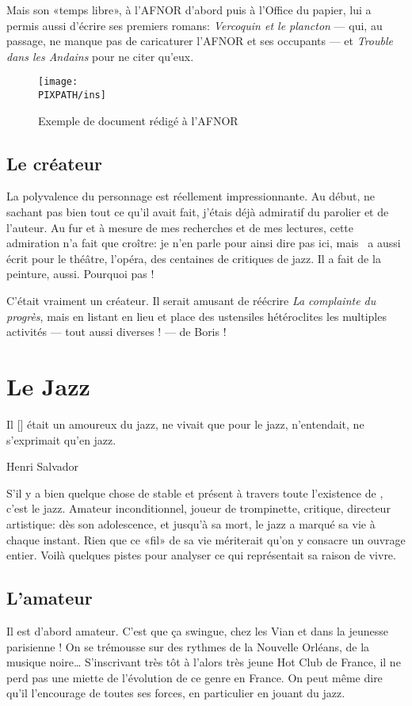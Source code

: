 Mais son «temps libre», à l'AFNOR d'abord puis à l'Office du papier, lui a permis aussi d'écrire ses premiers romans:
\emph{Vercoquin et le plancton} --- qui, au passage, ne manque pas de caricaturer l'AFNOR
et ses occupants --- et \emph{Trouble dans les Andains} pour ne citer qu'eux.

\begin{figure}
\centering
\texttt{[image: \\PIXPATH/ins]}
\caption{Exemple de document rédigé à l'AFNOR}
\label{ins}
\end{figure}

\subsection{Le créateur}

La polyvalence du personnage est réellement impressionnante. Au début, ne sachant pas bien
tout ce qu'il avait fait, j'étais déjà admiratif du parolier et de l'auteur. Au fur et
à mesure de mes recherches et de mes lectures, cette admiration n'a fait que croître: je n'en parle
pour ainsi dire pas ici, mais \BV\ a aussi écrit pour le théâtre, l'opéra, des centaines de
critiques de jazz. Il a fait de la peinture, aussi. Pourquoi pas !

C'était vraiment un créateur. Il serait amusant de réécrire \emph{La complainte du progrès},
mais en listant en lieu et place des ustensiles hétéroclites les multiples activités --- tout
aussi diverses ! --- de Boris !


\section{Le Jazz}
\epigraph{Il [\BV] était un amoureux du jazz, ne vivait que pour le jazz, n'entendait, ne s'exprimait qu'en jazz.}
{Henri Salvador}

S'il y a bien quelque chose de stable et présent à travers toute l'existence de \BV, c'est le jazz.
Amateur inconditionnel, joueur de trompinette, critique, directeur artistique: dès son adolescence, et
jusqu'à sa mort, le jazz a marqué sa vie à chaque instant. Rien que ce «fil» de sa vie mériterait
qu'on y consacre un ouvrage entier. Voilà quelques pistes pour analyser ce qui représentait
sa raison de vivre.

\subsection{L'amateur}

Il est d'abord amateur. C'est que ça swingue, chez les Vian et dans la jeunesse parisienne !
On se trémousse sur des rythmes de la Nouvelle Orléans, de la musique noire\ldots
S'inscrivant très tôt à l'alors très jeune Hot Club de France, il ne perd
pas une miette de l'évolution de ce genre en France. On peut même dire
qu'il l'encourage de toutes ses forces, en particulier en jouant du jazz.

